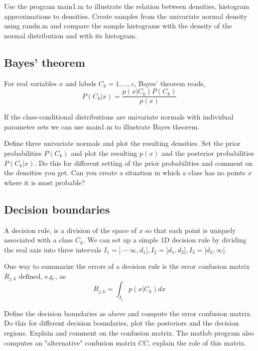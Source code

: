 \vspace*{3mm}

 Use the program {\sf main1.m} to
illustrate the relation between densities, histogram
approximations to densities. Create samples from the univariate
normal density using {\sf randn.m} and compare the sample
histograms with the density of the normal distribution and with
its histogram.


\subsection*{Bayes' theorem}
For real variables $x$ and labels $C_k=1,...,c$, Bayes' theorem reads,
\begin{equation}
P(C_k | x) = \frac{p(x|C_k) P(C_k)}{p(x)}
\end{equation}

If the class-conditional distributions are univariate normals with individual parameter sets
we can use {\sf main1.m} to illustrate Bayes theorem.

\vspace*{3mm}

 Define three univariate normals and plot the resulting densities. Set
the {\sf prior probabilities} $P(C_k)$ and plot the resulting $p(x)$ and
the posterior probabilities $P(C_k|x)$. Do this for different setting of the
prior probabilities and comment on the densities you get. Can you create a situation in which a class
has no points $x$ where it is most probable?


\subsection*{Decision boundaries}

A decision rule,  is a division of the
space of $x$ so that each point is uniquely associated with
a class $C_k$. We can set up a simple 1D decision rule by dividing the real axis into three
intervals $I_1 = ]-\infty, d_1], I_2 = ]d_1, d_2], I_3 = ]d_2, \infty[$.

One way to summarize the errors of a decision rule is the
 error confusion matrix $R_{j,k}$  defined, e.g., as
\begin{equation}
R_{j,k} = \int_{I_j} p(x|C_k) dx
\end{equation}

\vspace*{3mm}

 Define the decision boundaries as above and compute
 the error confusion matrix. Do this for different decision boundaries, plot the
posteriors and the decision regions. Explain and comment on the confusion matrix.
The matlab program also computes an "alternative" confusion matrix $CC$, explain the role of this matrix.

